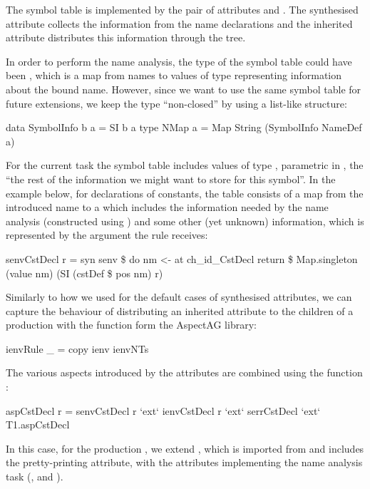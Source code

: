 The symbol table is implemented by the pair of attributes  and .
The synthesised attribute  collects the information from the name declarations
and the inherited attribute  distributes this information through the tree.

In order to perform the name analysis, the type of the symbol table could have been 
, which is a map from names to values of type  
representing information about the bound name. However, since we want to use the same symbol table
for future extensions, we keep the type ``non-closed'' by using a list-like structure:
\begin{haskell}
data SymbolInfo b a = SI b a
type NMap a = Map String (SymbolInfo NameDef a)
\end{haskell}
For the current  task the symbol table includes values of type ,
parametric in , the ``the rest of the information we might want to store for this symbol''.
In the example below, for declarations of constants, the table consists of a map from the introduced name 
to a  which includes the information needed by the name analysis (constructed using )
and some other (yet unknown) information, which is represented by the argument the rule receives:
\begin{haskell}
senvCstDecl r = syn senv \$ do  
                  nm <- at ch_id_CstDecl
                  return \$ Map.singleton (value nm) 
                                         (SI (cstDef \$ pos nm) r)
\end{haskell}
Similarly to how we used  for the default cases of synthesised attributes,
we can capture the behaviour of distributing an inherited attribute to the children of a production
with the function  form the AspectAG library:
\begin{haskell}
ienvRule _ = copy ienv ienvNTs 
\end{haskell}

The various aspects introduced by the attributes are combined using the function :
\begin{haskell}
aspCstDecl r = senvCstDecl r `ext` ienvCstDecl r `ext` 
               serrCstDecl   `ext` T1.aspCstDecl
\end{haskell}
In this case, for the production , we extend , 
which is imported from  and includes the pretty-printing attribute,
with the attributes implementing the name analysis task (,  and ).

